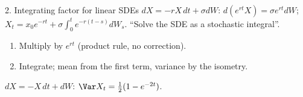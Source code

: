 \begin{card}{2. Integrating factor for linear SDEs}
\Formula
$dX=-rX\,dt+\sigma dW$: $d(e^{rt}X)=\sigma e^{rt}dW$; $X_t=x_0e^{-rt}+\sigma\int_0^te^{-r(t-s)}dW_s$.
\UseWhen
``Solve the SDE as a stochastic integral''.
\HowTo
\begin{enumerate}
  \item Multiply by $e^{rt}$ (product rule, no correction).
  \item Integrate; mean from the first term, variance by the isometry.
\end{enumerate}
\Caveats
{}
\begin{cardex}
$dX=-X\,dt+dW$: $\Var X_t=\frac12(1-e^{-2t})$.
\end{cardex}
\end{card}
